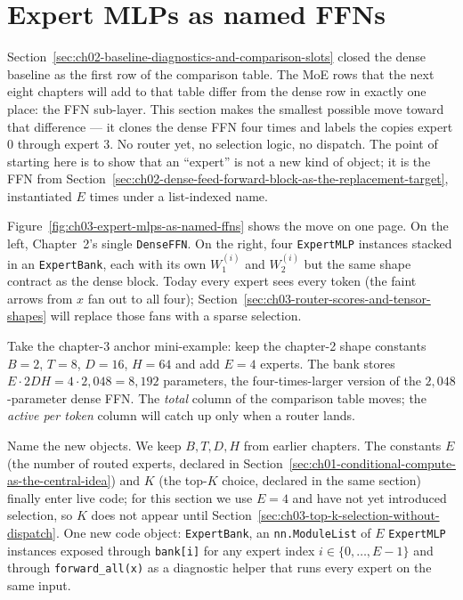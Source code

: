 \section{Expert MLPs as named FFNs}
\label{sec:ch03-expert-mlps-as-named-ffns}

Section~\ref{sec:ch02-baseline-diagnostics-and-comparison-slots} closed the dense baseline as the first row of the comparison table. The MoE rows that the next eight chapters will add to that table differ from the dense row in exactly one place: the FFN sub-layer. This section makes the smallest possible move toward that difference --- it clones the dense FFN four times and labels the copies expert $0$ through expert $3$. No router yet, no selection logic, no dispatch. The point of starting here is to show that an ``expert'' is not a new kind of object; it is the FFN from Section~\ref{sec:ch02-dense-feed-forward-block-as-the-replacement-target}, instantiated $E$ times under a list-indexed name.



Figure~\ref{fig:ch03-expert-mlps-as-named-ffns} shows the move on one page. On the left, Chapter~2's single \texttt{DenseFFN}. On the right, four \texttt{ExpertMLP} instances stacked in an \texttt{ExpertBank}, each with its own $W_1^{(i)}$ and $W_2^{(i)}$ but the same shape contract as the dense block. Today every expert sees every token (the faint arrows from $x$ fan out to all four); Section~\ref{sec:ch03-router-scores-and-tensor-shapes} will replace those fans with a sparse selection.

Take the chapter-3 anchor mini-example: keep the chapter-2 shape constants $B = 2$, $T = 8$, $D = 16$, $H = 64$ and add $E = 4$ experts. The bank stores $E \cdot 2 D H = 4 \cdot 2{,}048 = 8{,}192$ parameters, the four-times-larger version of the $2{,}048$-parameter dense FFN. The \emph{total} column of the comparison table moves; the \emph{active per token} column will catch up only when a router lands.

Name the new objects. We keep $B, T, D, H$ from earlier chapters. The constants $E$ (the number of routed experts, declared in Section~\ref{sec:ch01-conditional-compute-as-the-central-idea}) and $K$ (the top-$K$ choice, declared in the same section) finally enter live code; for this section we use $E = 4$ and have not yet introduced selection, so $K$ does not appear until Section~\ref{sec:ch03-top-k-selection-without-dispatch}. One new code object: \texttt{ExpertBank}, an \texttt{nn.ModuleList} of $E$ \texttt{ExpertMLP} instances exposed through \texttt{bank[i]} for any expert index $i \in \{0, \dots, E-1\}$ and through \texttt{forward\_all(x)} as a diagnostic helper that runs every expert on the same input.

